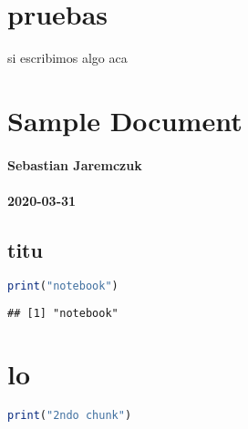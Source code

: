 \section{pruebas}


si escribimos algo aca











\hypertarget{TOC}{}

\hypertarget{header}{}
\hypertarget{sample-document}{%
	\section{Sample Document}\label{sample-document}}

\hypertarget{sebastian-jaremczuk}{%
	\paragraph{Sebastian Jaremczuk}\label{sebastian-jaremczuk}}

\hypertarget{section}{%
	\paragraph{2020-03-31}\label{section}}

\hypertarget{titu}{}
\hypertarget{titu}{%
	\subsection{titu}\label{titu}}

\begin{lstlisting}[language=R]
print("notebook")
\end{lstlisting}

\begin{lstlisting}
## [1] "notebook"
\end{lstlisting}

\hypertarget{lo}{}
\hypertarget{lo}{%
	\section{lo}\label{lo}}

\begin{lstlisting}[language=R]
print("2ndo chunk")
\end{lstlisting}

